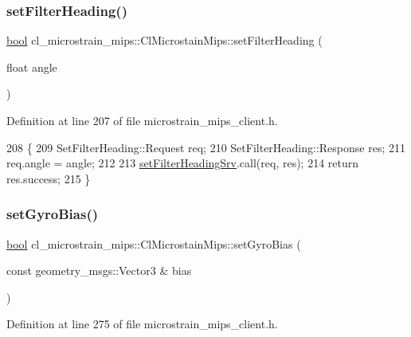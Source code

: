 \subsubsection{\texorpdfstring{set\+Filter\+Heading()}{setFilterHeading()}}
{\footnotesize\ttfamily \hyperlink{classbool}{bool} cl\+\_\+microstrain\+\_\+mips\+::\+Cl\+Microstain\+Mips\+::set\+Filter\+Heading (\begin{DoxyParamCaption}\item[{float}]{angle }\end{DoxyParamCaption})\hspace{0.3cm}{\ttfamily [inline]}}



Definition at line 207 of file microstrain\+\_\+mips\+\_\+client.\+h.


\begin{DoxyCode}
208     \{
209         SetFilterHeading::Request req;
210         SetFilterHeading::Response res;
211         req.angle = angle;
212 
213         \hyperlink{classcl__microstrain__mips_1_1ClMicrostainMips_abe64faba505dfdab0b78b7cf31f9609d}{setFilterHeadingSrv}.call(req, res);
214         \textcolor{keywordflow}{return} res.success;
215     \}
\end{DoxyCode}
\mbox{\label{classcl__microstrain__mips_1_1ClMicrostainMips_aabb65ca3b2e8be4a1ad2284d543ddd9c}} 
\subsubsection{\texorpdfstring{set\+Gyro\+Bias()}{setGyroBias()}}
{\footnotesize\ttfamily \hyperlink{classbool}{bool} cl\+\_\+microstrain\+\_\+mips\+::\+Cl\+Microstain\+Mips\+::set\+Gyro\+Bias (\begin{DoxyParamCaption}\item[{const geometry\+\_\+msgs\+::\+Vector3 \&}]{bias }\end{DoxyParamCaption})\hspace{0.3cm}{\ttfamily [inline]}}



Definition at line 275 of file microstrain\+\_\+mips\+\_\+client.\+h.


